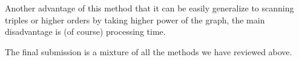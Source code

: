 \documentclass{article}
\begin{document}
\begin{multicols*}{2}
Another advantage of this method that it can be easily generalize to scanning triples or higher orders by taking higher power of the graph, the main disadvantage is (of course) processing time.       

The final submission is a mixture of all the methods we have reviewed above.   

\printbibliography 
\end{multicols*}

\end{document}
